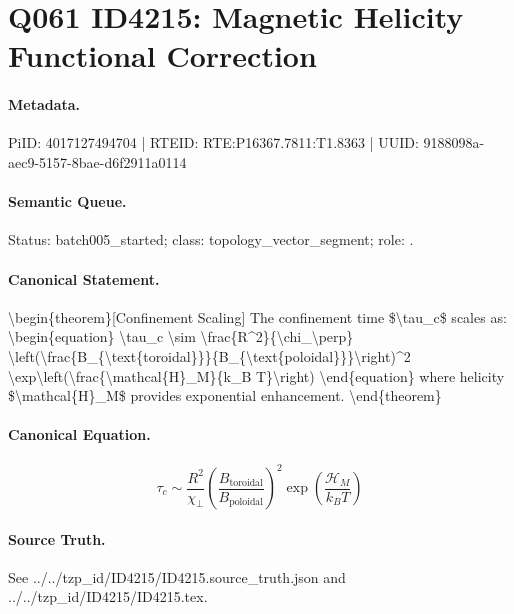 \section*{Q061 ID4215: Magnetic Helicity Functional Correction}
\paragraph{Metadata.}
PiID: 4017127494704 | RTEID: RTE:P16367.7811:T1.8363 | UUID: 9188098a-aec9-5157-8bae-d6f2911a0114

\paragraph{Semantic Queue.}
Status: batch005\_started; class: topology\_vector\_segment; role: .

\paragraph{Canonical Statement.}
\textbackslash{}begin\{theorem\}[Confinement Scaling] The confinement time \$\textbackslash{}tau\_c\$ scales as: \textbackslash{}begin\{equation\} \textbackslash{}tau\_c \textbackslash{}sim \textbackslash{}frac\{R\textasciicircum{}2\}\{\textbackslash{}chi\_\textbackslash{}perp\} \textbackslash{}left(\textbackslash{}frac\{B\_\{\textbackslash{}text\{toroidal\}\}\}\{B\_\{\textbackslash{}text\{poloidal\}\}\}\textbackslash{}right)\textasciicircum{}2 \textbackslash{}exp\textbackslash{}left(\textbackslash{}frac\{\textbackslash{}mathcal\{H\}\_M\}\{k\_B T\}\textbackslash{}right) \textbackslash{}end\{equation\} where helicity \$\textbackslash{}mathcal\{H\}\_M\$ provides exponential enhancement. \textbackslash{}end\{theorem\}

\paragraph{Canonical Equation.}
\[
\begin{equation} \tau_c \sim \frac{R^2}{\chi_\perp} \left(\frac{B_{\text{toroidal}}}{B_{\text{poloidal}}}\right)^2 \exp\left(\frac{\mathcal{H}_M}{k_B T}\right) \end{equation}
\]

\paragraph{Source Truth.}
See ../../tzp\_id/ID4215/ID4215.source\_truth.json and ../../tzp\_id/ID4215/ID4215.tex.
